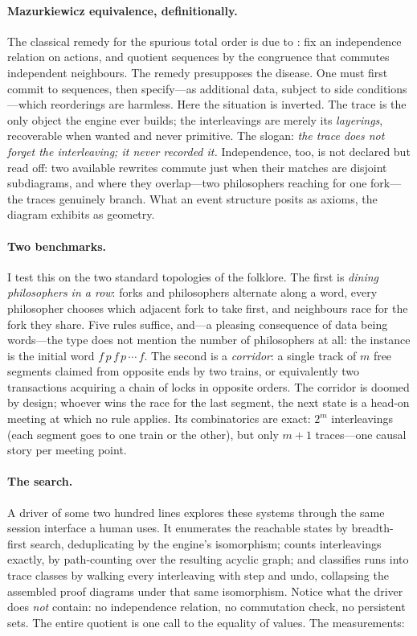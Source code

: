 \paragraph{Mazurkiewicz equivalence, definitionally.}
The classical remedy for the spurious total order is due to
\textcite{mazurkiewicz_1977}: fix an independence relation on actions,
and quotient sequences by the congruence that commutes independent
neighbours. The remedy presupposes the disease. One must first commit to
sequences, then specify---as additional data, subject to side
conditions---which reorderings are harmless. Here the situation is
inverted. The trace is the only object the engine ever builds; the
interleavings are merely its \emph{layerings}, recoverable when wanted
and never primitive. The slogan: \emph{the trace does not forget the
interleaving; it never recorded it.} Independence, too, is not declared
but read off: two available rewrites commute just when their matches are
disjoint subdiagrams, and where they overlap---two philosophers reaching
for one fork---the traces genuinely branch. What an event structure
posits as axioms, the diagram exhibits as geometry.

\paragraph{Two benchmarks.}
I test this on the two standard topologies of the folklore. The first is
\emph{dining philosophers in a row}: forks and philosophers alternate
along a word, every philosopher chooses which adjacent fork to take
first, and neighbours race for the fork they share. Five rules suffice,
and---a pleasing consequence of data being words---the type does not
mention the number of philosophers at all: the instance is the initial
word $f\,p\,f\,p\,\cdots\,f$. The second is a \emph{corridor}: a single
track of $m$ free segments claimed from opposite ends by two trains, or
equivalently two transactions acquiring a chain of locks in opposite
orders. The corridor is doomed by design; whoever wins the race for the
last segment, the next state is a head-on meeting at which no rule
applies. Its combinatorics are exact: $2^m$ interleavings (each segment goes
to one train or the other), but only $m+1$ traces---one causal story per
meeting point.

\paragraph{The search.}
A driver of some two hundred lines explores these systems through the
same session interface a human uses. It enumerates the reachable states
by breadth-first search, deduplicating by the engine's isomorphism;
counts interleavings exactly, by path-counting over the resulting acyclic
graph; and classifies runs into trace classes by walking every interleaving
with step and undo, collapsing the assembled proof diagrams under that
same isomorphism. Notice what the driver does \emph{not} contain: no
independence relation, no commutation check, no persistent sets. The
entire quotient is one call to the equality of values. The measurements:

